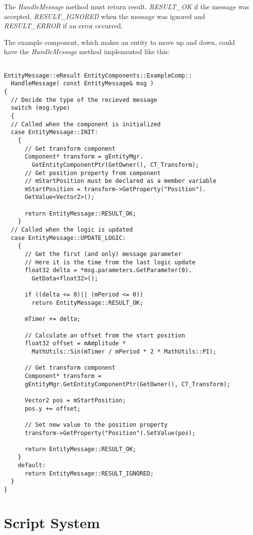 \documentclass[a4paper, 12pt]{report}
\begin{document}
The \emph{HandleMessage} method must return result. \emph{RESULT\_OK} if the message was accepted, \emph{RESULT\_IGNORED} when the message was ignored and \emph{RESULT\_ERROR} if an error occurred.

The example component, which makes an entity to move up and down, could have the \emph{HandleMessage} method implemented like this:

\footnotesize 
\begin{verbatim}

EntityMessage::eResult EntityComponents::ExampleComp::
  HandleMessage( const EntityMessage& msg )
{
  // Decide the type of the recieved message
  switch (msg.type)
  {
  // Called when the component is initialized
  case EntityMessage::INIT:
    {
      // Get transform component
      Component* transform = gEntityMgr.
        GetEntityComponentPtr(GetOwner(), CT_Transform);
      // Get position property from component
      // mStartPosition must be declared as a member variable
      mStartPosition = transform->GetProperty("Position").
      GetValue<Vector2>();

      return EntityMessage::RESULT_OK;
    }
  // Called when the logic is updated
  case EntityMessage::UPDATE_LOGIC:
    {
      // Get the first (and only) message parameter
      // Here it is the time from the last logic update
      float32 delta = *msg.parameters.GetParameter(0).
        GetData<float32>();

      if ((delta <= 0)|| (mPeriod <= 0))
        return EntityMessage::RESULT_OK;

      mTimer += delta;

      // Calculate an offset from the start position
      float32 offset = mAmplitude * 
        MathUtils::Sin(mTimer / mPeriod * 2 * MathUtils::PI);

      // Get transform component
      Component* transform = 
      gEntityMgr.GetEntityComponentPtr(GetOwner(), CT_Transform);

      Vector2 pos = mStartPosition;
      pos.y += offset;

      // Set new value to the position property
      transform->GetProperty("Position").SetValue(pos);

      return EntityMessage::RESULT_OK;
    }
    default:
      return EntityMessage::RESULT_IGNORED;
  }
}
\end{verbatim}
\normalsize

\chapter{Script System}
\end{document}
